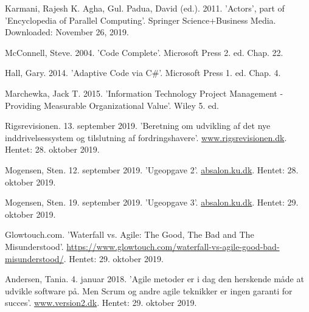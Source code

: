 \begin{thebibliography}{9}
Karmani, Rajesh K. Agha, Gul. Padua, David (ed.). 2011. 'Actors', part of 'Encyclopedia of Parallel Computing'. Springer Science+Business Media. Downloaded: November 26, 2019.

McConnell, Steve. 2004. 'Code Complete'. Microsoft Press 2. ed. Chap. 22.

Hall, Gary. 2014. 'Adaptive Code via C\#'. Microsoft Press 1. ed. Chap. 4.

Marchewka, Jack T. 2015. 'Information Technology Project Management - Providing Measurable Organizational Value'. Wiley 5. ed.

Rigsrevisionen. 13. september 2019. 'Beretning om udvikling af det nye inddrivelsessystem og tilslutning af fordringshavere'. \url{www.rigsrevisionen.dk}. Hentet: 28. oktober 2019.

Mogensen, Sten. 12. september 2019. 'Ugeopgave 2'. \url{absalon.ku.dk}. Hentet: 28. oktober 2019.

Mogensen, Sten. 19. september 2019. 'Ugeopgave 3'. \url{absalon.ku.dk}. Hentet: 29. oktober 2019.

Glowtouch.com. 'Waterfall vs. Agile: The Good, The Bad and The Misunderstood'. \url{https://www.glowtouch.com/waterfall-vs-agile-good-bad-misunderstood/}. Hentet: 29. oktober 2019.

Andersen, Tania. 4. januar 2018. 'Agile metoder er i dag den herskende måde at udvikle software på. Men Scrum og andre agile teknikker er ingen garanti for succes'. \url{www.version2.dk}. Hentet: 29. oktober 2019.
\end{thebibliography}